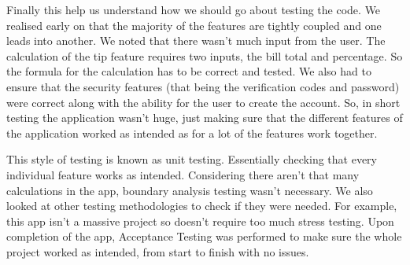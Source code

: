Finally this help us understand how we should go about testing the code. We realised early on that the majority of the features are tightly coupled and one leads into another. We noted that there wasn't much input from the user. The calculation of the tip feature requires two inputs, the bill total and percentage. So the formula for the calculation has to be correct and tested. We also had to ensure that the security features (that being the verification codes and password) were correct along with the ability for the user to create the account. So, in short testing the application wasn't huge, just making sure that the different features of the application worked as intended as for a lot of the features work together. 

This style of testing is known as unit testing. Essentially checking that every individual feature works as intended\cite{runeson2006survey}. Considering there aren't that many calculations in the app, boundary analysis testing wasn't necessary. We also looked at other testing methodologies to check if they were needed. For example, this app isn't a massive project so doesn't require too much stress testing. Upon completion of the app, Acceptance Testing was performed to make sure the whole project worked as intended, from start to finish with no issues. 